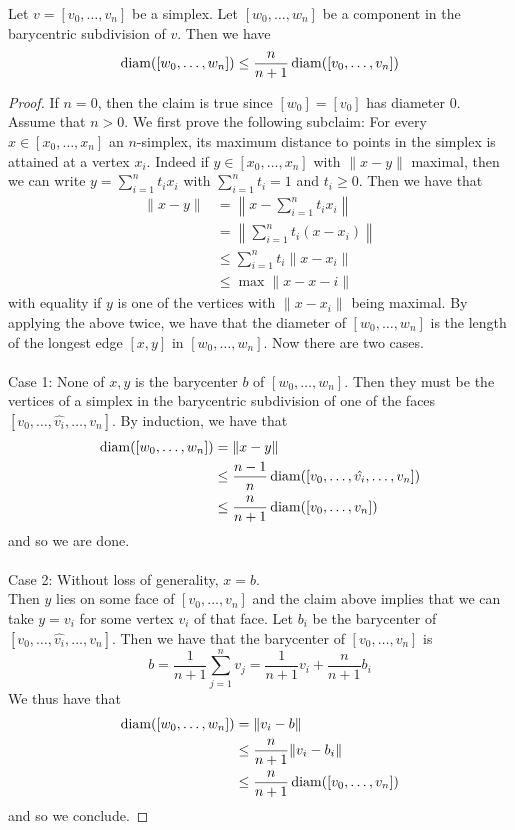 \documentclass[a4paper]{article}
\begin{document}
\begin{lmm}{}{} Let $v=[v_0,\dots,v_n]$ be a simplex. Let $[w_0,\dots,w_n]$ be a component in the barycentric subdivision of $v$. Then we have $$\operatorname{diam}([w_0,\dots,w_n])\leq\frac{n}{n+1}\operatorname{diam}([v_0,\dots,v_n])$$ \tcbline
\begin{proof}
If $n=0$, then the claim is true since $[w_0]=[v_0]$ has diameter $0$. Assume that $n>0$. We first prove the following subclaim: For every $x\in[x_0,\dots,x_n]$ an $n$-simplex, its maximum distance to points in the simplex is attained at a vertex $x_i$. Indeed if $y\in[x_0,\dots,x_n]$ with $\|x-y\|$ maximal, then we can write $y=\sum_{i=1}^nt_ix_i$ with $\sum_{i=1}^nt_i=1$ and $t_i\geq 0$. Then we have that 
\begin{align*}
\|x-y\|&=\left\|x-\sum_{i=1}^nt_ix_i\right\|\\
&=\left\|\sum_{i=1}^nt_i(x-x_i)\right\|\\
&\leq\sum_{i=1}^nt_i\|x-x_i\|\\
&\leq\max\|x-x-i\|
\end{align*}
with equality if $y$ is one of the vertices with $\|x-x_i\|$ being maximal. By applying the above twice, we have that the diameter of $[w_0,\dots,w_n]$ is the length of the longest edge $[x,y]$ in $[w_0,\dots,w_n]$. Now there are two cases. \\~\\

Case 1: None of $x,y$ is the barycenter $b$ of $[w_0,\dots,w_n]$. Then they must be the vertices of a simplex in the barycentric subdivision of one of the faces $[v_0,\dots,\hat{v_i},\dots,v_n]$. By induction, we have that 
\begin{align*}
\operatorname{diam}([w_0,\dots,w_n])&=\|x-y\|\\
&\leq\frac{n-1}{n}\operatorname{diam}([v_0,\dots,\hat{v_i},\dots,v_n])\\
&\leq\frac{n}{n+1}\operatorname{diam}([v_0,\dots,v_n])
\end{align*}
and so we are done. \\~\\

Case 2: Without loss of generality, $x=b$. \\
Then $y$ lies on some face of $[v_0,\dots,v_n]$ and the claim above implies that we can take $y=v_i$ for some vertex $v_i$ of that face. Let $b_i$ be the barycenter of $[v_0,\dots,\hat{v_i},\dots,v_n]$. Then we have that the barycenter of $[v_0,\dots,v_n]$ is $$b=\frac{1}{n+1}\sum_{j=1}^nv_j=\frac{1}{n+1}v_i+\frac{n}{n+1}b_i$$ We thus have that 
\begin{align*}
\operatorname{diam}([w_0,\dots,w_n])&=\|v_i-b\|\\
&\leq\frac{n}{n+1}\|v_i-b_i\|\\
&\leq\frac{n}{n+1}\operatorname{diam}([v_0,\dots,v_n])
\end{align*}
and so we conclude. 
\end{proof}
\end{lmm}
\end{document}
